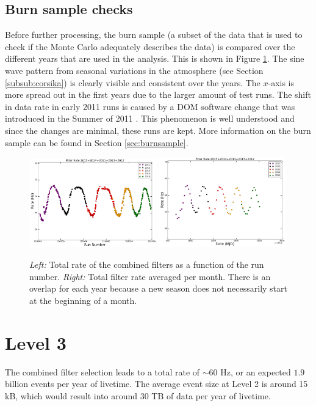 \subsection{Burn sample checks}
Before further processing, the burn sample (a subset of the data that is used to check if the Monte Carlo adequately describes the data) is compared over the different years that are used in the analysis. This is shown in Figure \ref{fig:burnsamplechecks}. The sine wave pattern from seasonal variations in the atmosphere (see Section \ref{subsub:corsika}) is clearly visible and consistent over the years. The $x$-axis is more spread out in the first years due to the larger amount of test runs. The shift in data rate in early 2011 runs is caused by a DOM software change that was introduced in the Summer of 2011 \cite{2011rate}. This phenomenon is well understood and since the changes are minimal, these runs are kept.
More information on the burn sample can be found in Section \ref{sec:burnsample}.

\begin{figure}[t]
\centering
\includegraphics[width=0.49\textwidth]{chapter8/img/FilterRatePerRun.png}
\includegraphics[width=0.49\textwidth]{chapter8/img/FilterRatePerMonth.png}
\caption{\textit{Left: }Total rate of the combined filters as a function of the run number. \textit{Right: }Total filter rate averaged per month. There is an overlap for each year because a new season does not necessarily start at the beginning of a month.}
\label{fig:burnsamplechecks}
\end{figure}

\section{Level 3}
The combined filter selection leads to a total rate of $\sim60$ Hz, or an expected $1.9$ billion events per year of livetime. The average event size at Level 2 is around 15 kB, which would result into around 30 TB of data per year of livetime.

